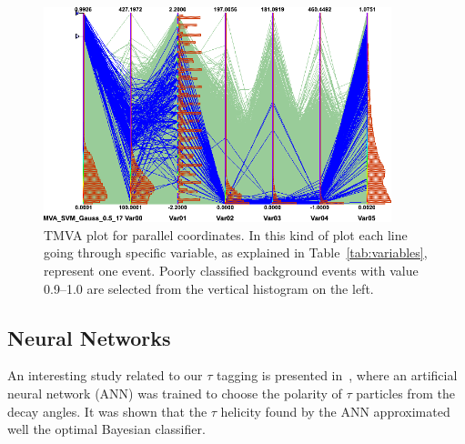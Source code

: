 \documentclass[a4paper]{jpconf}
\begin{document}
 




\begin{figure}[h]
\begin{center}
\includegraphics[width=0.9\textwidth]{images/svm_parallels2.png}
  \caption{TMVA plot for parallel coordinates. 
In this kind of plot each line going through specific variable,
as explained in Table~\ref{tab:variables}, represent one event.
Poorly classified background events with value 0.9--1.0 are 
selected from the vertical histogram on the left. 
}
  \label{fig:mkSvmParallels}
\end{center}
\end{figure}


\subsection{Neural Networks}
An interesting study related to our $\tau$ tagging is presented in~\cite{tauneural}, 
where an artificial neural network (ANN) was trained 
to choose the polarity of $\tau$ particles from the decay angles.
It was shown that the $\tau$ helicity found by the ANN 
approximated well the optimal Bayesian classifier.
\end{document}

